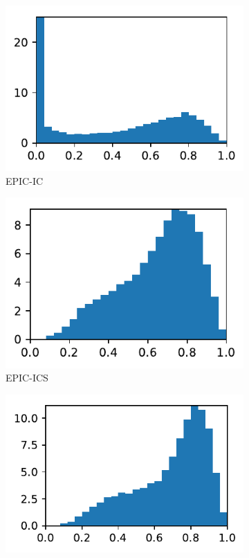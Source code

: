 \documentclass[3p,times,procedia,number]{elsarticle}
\begin{document}
\begin{figure}
\begin{subfigure}{.16\textwidth}
\centering
\includegraphics[width=\textwidth]{epic-ic-cube-cylinder-polar-1-quality.pdf}
\caption{EPIC-IC}
\end{subfigure}
\begin{subfigure}{.16\textwidth}
\centering
\includegraphics[width=\textwidth]{epic-ics-cube-cylinder-polar-1-quality.pdf}
\caption{EPIC-ICS}
\end{subfigure}
\begin{subfigure}{.16\textwidth}
\centering
\includegraphics[width=\textwidth]{epic-icsm-cube-cylinder-polar-1-quality.pdf}

\end{subfigure}
\end{figure}
\end{document}
